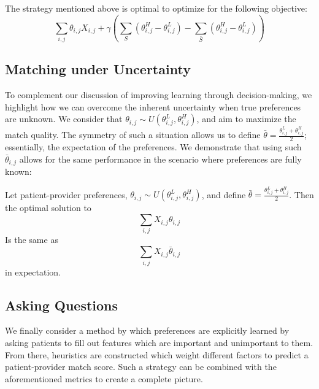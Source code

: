 \begin{conjecture}
    The strategy mentioned above is optimal to optimize for the following objective: 
    \begin{equation}
    \sum_{i,j} \theta_{i,j} X_{i,j} + \gamma (\sum_{S} (\theta^{H}_{i,j}-\theta^{L}_{i,j}) - \sum_{\bar{S}} (\theta^{H}_{i,j}-\theta^{L}_{i,j}) )
    \end{equation}

\end{conjecture}

\subsection{Matching under Uncertainty}
To complement our discussion of improving learning through decision-making, we highlight how we can overcome the inherent uncertainty when true preferences are unknown. 
We consider that $\theta_{i,j} \sim U(\theta_{i,j}^{L},\theta_{i,j}^{H})$, and aim to maximize the match quality. 
The symmetry of such a situation allows us to define $\bar{\theta} = \frac{\theta_{i,j}^{L} + \theta_{i,j}^{H}}{2}$; essentially, the expectation of the preferences. 
We demonstrate that using such $\bar{\theta}_{i,j}$ allows for the same performance in the scenario where preferences are fully known: 
\begin{lemma}
    Let patient-provider preferences, $\theta_{i,j} \sim U(\theta_{i,j}^{L},\theta_{i,j}^{H})$, and define $\bar{\theta} = \frac{\theta_{i,j}^{L} + \theta_{i,j}^{H}}{2}$. 
    Then the optimal solution to 
    \begin{equation}
        \sum_{i,j} X_{i,j} \theta_{i,j}
    \end{equation}
    Is the same as 
    \begin{equation}
        \sum_{i,j} X_{i,j} \bar{\theta}_{i,j}
    \end{equation}
    in expectation. 
\end{lemma}

\subsection{Asking Questions}
We finally consider a method by which preferences are explicitly learned by asking patients to fill out features which are important and unimportant to them. 
From there, heuristics are constructed which weight different factors to predict a patient-provider match score. 
Such a strategy can be combined with the aforementioned metrics to create a complete picture. 
